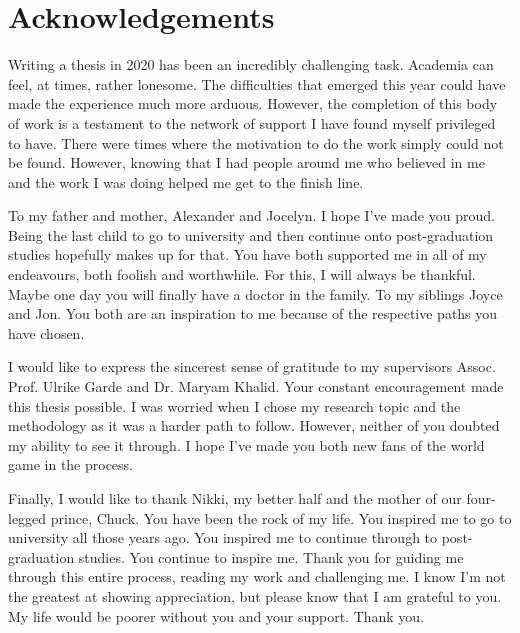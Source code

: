 

\chapter*{Acknowledgements}

Writing a thesis in 2020 has been an incredibly challenging task. Academia can feel, at times, rather lonesome. The difficulties that emerged this year could have made the experience much more arduous. However, the completion of this body of work is a testament to the network of support I have found myself privileged to have. There were times where the motivation to do the work simply could not be found. However, knowing that I had people around me who believed in me and the work I was doing helped me get to the finish line.

To my father and mother, Alexander and Jocelyn. I hope I’ve made you proud. Being the last child to go to university and then continue onto post-graduation studies hopefully makes up for that. You have both supported me in all of my endeavours, both foolish and worthwhile. For this, I will always be thankful. Maybe one day you will finally have a doctor in the family. To my siblings Joyce and Jon. You both are an inspiration to me because of the respective paths you have chosen.

I would like to express the sincerest sense of gratitude to my supervisors Assoc. Prof. Ulrike Garde and Dr. Maryam Khalid. Your constant encouragement made this thesis possible. I was worried when I chose my research topic and the methodology as it was a harder path to follow. However, neither of you doubted my ability to see it through. I hope I’ve made you both new fans of the world game in the process.

Finally, I would like to thank Nikki, my better half and the mother of our four-legged prince, Chuck. You have been the rock of my life. You inspired me to go to university all those years ago. You inspired me to continue through to post-graduation studies. You continue to inspire me. Thank you for guiding me through this entire process, reading my work and challenging me. I know I’m not the greatest at showing appreciation, but please know that I am grateful to you. My life would be poorer without you and your support. Thank you.